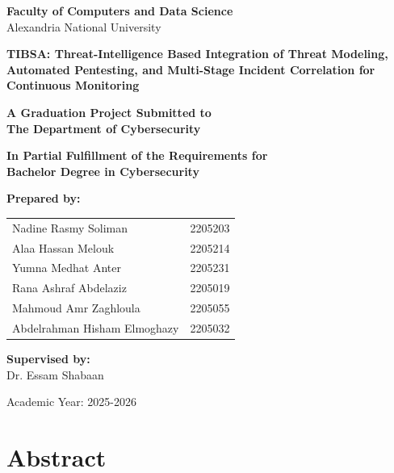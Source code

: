 \documentclass[12pt,a4paper]{report}
\begin{document}
\begin{titlepage}
    \centering
    \vspace*{1cm}
    
    {\LARGE\bfseries Faculty of Computers and Data Science \\[0.5cm]}
    {\Large Alexandria National University\\[2cm]}
    
    {\Huge\bfseries TIBSA: Threat-Intelligence Based Integration of Threat Modeling, Automated Pentesting, and Multi-Stage Incident Correlation for Continuous Monitoring\\[2cm]}
    
    {\large\bfseries A Graduation Project Submitted to\\
    The Department of Cybersecurity\\[1cm]}
    
    {\large\bfseries In Partial Fulfillment of the Requirements for\\
    Bachelor Degree in Cybersecurity\\[2cm]}
    
    {\large\bfseries Prepared by:}\\[0.5cm]
    \begin{tabular}{ll}
        Nadine Rasmy Soliman & 2205203 \\
        Alaa Hassan Melouk & 2205214 \\
        Yumna Medhat Anter & 2205231 \\
        Rana Ashraf Abdelaziz & 2205019 \\
        Mahmoud Amr Zaghloula & 2205055 \\
        Abdelrahman Hisham Elmoghazy & 2205032 \\
    \end{tabular}
    
    \vfill
    
    {\large\bfseries Supervised by:\\[0.3cm]}
    {\Large Dr. Essam Shabaan\\[1cm]}
    
    {\large Academic Year: 2025-2026}
    
\end{titlepage}

\chapter*{Abstract}
\end{document}
